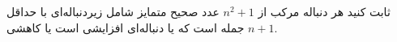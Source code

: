     \p 
ثابت کنید هر دنباله مرکب از
$n^2 + 1$
عدد صحیح متمایز شامل زیردنباله‌ای با حداقل
$n + 1$
جمله است که یا دنباله‌ای افزایشی است یا کاهشی.